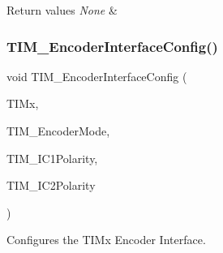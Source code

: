\begin{DoxyRetVals}{Return values}
{\em None} & \\
\hline
\end{DoxyRetVals}
\mbox{\label{group___t_i_m___exported___functions_ga0fc7e76c47a3bd1ba1ebc71427832b51}} 
\subsubsection{\texorpdfstring{TIM\_EncoderInterfaceConfig()}{TIM\_EncoderInterfaceConfig()}}
{\footnotesize\ttfamily void T\+I\+M\+\_\+\+Encoder\+Interface\+Config (\begin{DoxyParamCaption}\item[{\mbox{\hyperlink{struct_t_i_m___type_def}{T\+I\+M\+\_\+\+Type\+Def}} $\ast$}]{T\+I\+Mx,  }\item[{uint16\+\_\+t}]{T\+I\+M\+\_\+\+Encoder\+Mode,  }\item[{uint16\+\_\+t}]{T\+I\+M\+\_\+\+I\+C1\+Polarity,  }\item[{uint16\+\_\+t}]{T\+I\+M\+\_\+\+I\+C2\+Polarity }\end{DoxyParamCaption})}



Configures the T\+I\+Mx Encoder Interface. 


